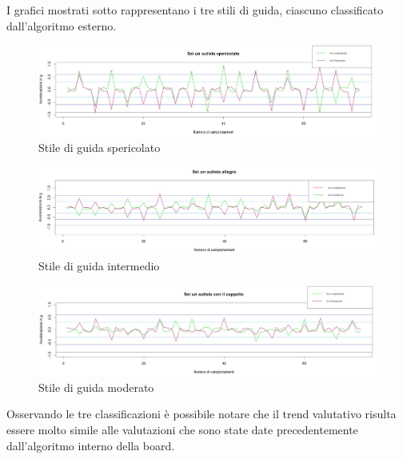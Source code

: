 \documentclass[12pt, a4paper, italian]{report}
\numberwithin{figure}{chapter}
\numberwithin{table}{chapter}
\begin{document}
\vspace{1cm}

I grafici mostrati sotto rappresentano i tre stili di guida, ciascuno classificato dall'algoritmo esterno. 

\begin{figure}[h]
  \centering
  \includegraphics[width=15cm]{GuidaSpericolata.png}
  \caption{Stile di guida spericolato}
  \label{Guida spericolata}
\end{figure}

\newpage

\begin{figure}[h]
  \centering
  \includegraphics[width=15cm]{GuidaIntermedia.png}
  \caption{Stile di guida intermedio}
  \label{Guida intermedia}
\end{figure}

\begin{figure}[h]
  \centering
  \includegraphics[width=15cm]{GuidaModerata.png}
  \caption{Stile di guida moderato}
  \label{Guida moderata}
\end{figure}

Osservando le tre classificazioni è possibile notare che il trend valutativo risulta essere molto simile alle valutazioni che sono state date precedentemente dall'algoritmo interno della board. 

\vspace{1cm}
\end{document}
